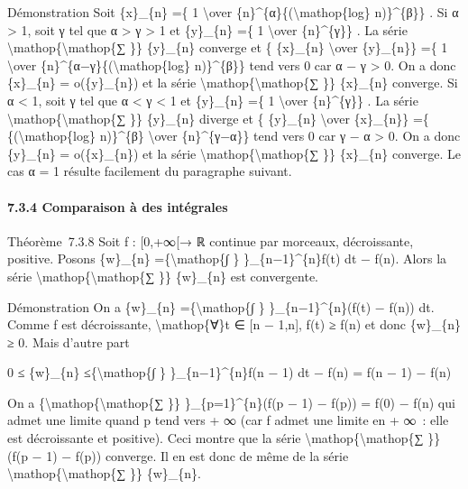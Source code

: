 \documentclass[]{article}
\begin{document}
Démonstration Soit \{x\}\_\{n\} =\{ 1 \textbackslash{}over
\{n\}\^{}\{α\}\{(\textbackslash{}mathop\{log\} n)\}\^{}\{β\}\} . Si α
\textgreater{} 1, soit γ tel que α \textgreater{} γ \textgreater{} 1 et
\{y\}\_\{n\} =\{ 1 \textbackslash{}over \{n\}\^{}\{γ\}\} . La série
\textbackslash{}mathop\{\textbackslash{}mathop\{∑ \}\} \{y\}\_\{n\}
converge et \{ \{x\}\_\{n\} \textbackslash{}over \{y\}\_\{n\}\} =\{ 1
\textbackslash{}over \{n\}\^{}\{α−γ\}\{(\textbackslash{}mathop\{log\}
n)\}\^{}\{β\}\} tend vers 0 car α − γ \textgreater{} 0. On a donc
\{x\}\_\{n\} = o(\{y\}\_\{n\}) et la série
\textbackslash{}mathop\{\textbackslash{}mathop\{∑ \}\} \{x\}\_\{n\}
converge. Si α \textless{} 1, soit γ tel que α \textless{} γ \textless{}
1 et \{y\}\_\{n\} =\{ 1 \textbackslash{}over \{n\}\^{}\{γ\}\} . La série
\textbackslash{}mathop\{\textbackslash{}mathop\{∑ \}\} \{y\}\_\{n\}
diverge et \{ \{y\}\_\{n\} \textbackslash{}over \{x\}\_\{n\}\} =\{
\{(\textbackslash{}mathop\{log\} n)\}\^{}\{β\} \textbackslash{}over
\{n\}\^{}\{γ−α\}\} tend vers 0 car γ − α \textgreater{} 0. On a donc
\{y\}\_\{n\} = o(\{x\}\_\{n\}) et la série
\textbackslash{}mathop\{\textbackslash{}mathop\{∑ \}\} \{x\}\_\{n\}
converge. Le cas α = 1 résulte facilement du paragraphe suivant.

\paragraph{7.3.4 Comparaison à des intégrales}

Théorème~7.3.8 Soit f : {[}0,+∞{[}→ ℝ continue par morceaux,
décroissante, positive. Posons \{w\}\_\{n\} =\{\textbackslash{}mathop\{∫
\} \}\_\{n−1\}\^{}\{n\}f(t) dt − f(n). Alors la série
\textbackslash{}mathop\{\textbackslash{}mathop\{∑ \}\} \{w\}\_\{n\} est
convergente.

Démonstration On a \{w\}\_\{n\} =\{\textbackslash{}mathop\{∫ \}
\}\_\{n−1\}\^{}\{n\}(f(t) − f(n)) dt. Comme f est décroissante,
\textbackslash{}mathop\{∀\}t ∈ {[}n − 1,n{]}, f(t) ≥ f(n) et donc
\{w\}\_\{n\} ≥ 0. Mais d'autre part

0 ≤ \{w\}\_\{n\} ≤\{\textbackslash{}mathop\{∫ \} \}\_\{n−1\}\^{}\{n\}f(n
− 1) dt − f(n) = f(n − 1) − f(n)

On a \{\textbackslash{}mathop\{\textbackslash{}mathop\{∑ \}\}
\}\_\{p=1\}\^{}\{n\}(f(p − 1) − f(p)) = f(0) − f(n) qui admet une limite
quand p tend vers + ∞ (car f admet une limite en + ∞~: elle est
décroissante et positive). Ceci montre que la série
\textbackslash{}mathop\{\textbackslash{}mathop\{∑ \}\} (f(p − 1) − f(p))
converge. Il en est donc de même de la série
\textbackslash{}mathop\{\textbackslash{}mathop\{∑ \}\} \{w\}\_\{n\}.
\end{document}
